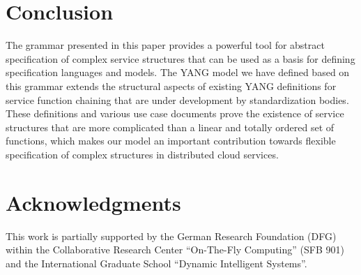 \documentclass{sig-alternate-per}
\begin{document}
\section{Conclusion}
\label{sec:conclusion}
The grammar presented in this paper provides a powerful tool for abstract 
specification of complex service structures that can be used as a basis for defining 
specification languages and models. The YANG model we have defined based on this 
grammar extends the structural aspects of existing YANG definitions for service 
function chaining that are under development by standardization bodies. These 
definitions and various use case documents prove the existence of service structures
that are more complicated than a linear and totally ordered set of functions, which
makes our model an important contribution towards flexible specification
of complex structures in distributed cloud services. 

\section{Acknowledgments}
This work is partially supported by the German Research Foundation (DFG) within
the Collaborative Research Center “On-The-Fly Computing” (SFB 901) and the 
International Graduate School ``Dynamic Intelligent Systems''.
\\
\\

  
\end{document}
